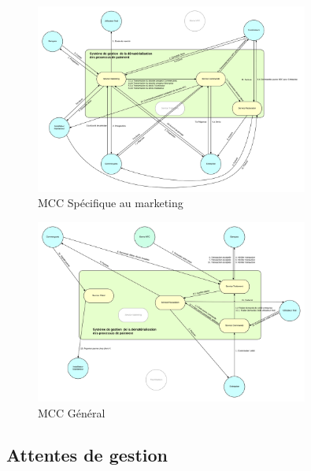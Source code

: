 \begin{figure}[ht]
    \centering
    \includegraphics[width=0.8\textwidth]{mcc-marketing}
    \caption{MCC Spécifique au marketing}
    \label{fig:mcc-marketing}
\end{figure}

\begin{figure}[ht]
    \centering
    \includegraphics[width=0.8\textwidth]{mcc-extra}
    \caption{MCC Général}
    \label{fig:mcc-extra}
\end{figure}

\subsection{Attentes de gestion}

